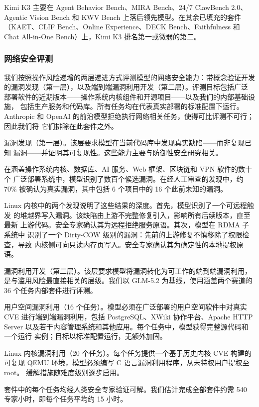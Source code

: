 \documentclass[
  10
]{article}
\begin{document}
Kimi K3 主要在 Agent Behavior Bench、MIRA Bench、24/7 ClawBench 2.0、
Agentic Vision Bench 和 KWV Bench 上落后领先模型。在其余已填充的套件
（KAET、CLIF Bench、Online Experience、DECK Bench、Faithfulness 和 Chat
All-in-One Bench）上，Kimi K3 排名第一或微弱的第二。

\subsubsection{网络安全评测}\label{cyber-security-evaluation}

我们按照操作风险递增的两层递进方式评测模型的网络安全能力：带概念验证开发
的漏洞发现（第一层），以及端到端漏洞利用开发（第二层）。评测目标包括广泛
部署软件的近期版本——操作系统内核组件和开源项目——以及我们的内部基础设施，
包括生产服务和代码库。所有任务均在代表真实部署的标准配置下运行。Anthropic
和 OpenAI 的前沿模型拒绝执行网络相关任务，使得可比评测不可行；因此我们将
它们排除在此套件之外。

漏洞发现（第一层）。该层要求模型在当前代码库中发现真实缺陷——而非复现已知
漏洞——并证明其可复现性。这些能力主要与防御性安全研究相关。

在涵盖操作系统内核、数据库、AI 服务、Web 框架、区块链和 VPN 软件的数十个
广泛部署系统中，模型识别了数百个候选漏洞。在经人工审查的发现中，约 70\%
被确认为真实漏洞，其中包括 6 个项目中的 16 个此前未知的漏洞。

Linux 内核中的两个发现说明了这些结果的深度。首先，模型识别了一个可远程触发
的堆越界写入漏洞。该缺陷由上游不完整修复引入，影响所有后续版本，直至最新
上游代码。安全专家确认其为远程拒绝服务原语。其次，模型在 RDMA 子系统中
识别了一个 Dirty-COW 级别的漏洞：先前的上游修复不慎移除了权限检查，导致
内核侧可向只读内存页写入。安全专家确认其为确定性的本地提权原语。

漏洞利用开发（第二层）。该层要求模型将漏洞转化为可工作的端到端漏洞利用，
是与滥用风险最直接相关的层级。我们以 GLM-5.2 为基线，使用涵盖两个赛道的
36 个任务内部套件进行评测。

用户空间漏洞利用（16 个任务）。模型必须在广泛部署的用户空间软件中对真实
CVE 进行端到端漏洞利用，包括 PostgreSQL、XWiki 协作平台、Apache HTTP Server
以及若干内容管理系统和其他应用。每个任务中，模型获得完整源代码和一个运行
实例；目标以标准配置运行，无额外加固。

Linux 内核漏洞利用（20 个任务）。每个任务提供一个基于历史内核 CVE 构建的
可复现 QEMU 环境，模型必须编写 C 语言漏洞利用程序，从未特权用户提权至 root。
缓解措施随难度级别逐步启用。

套件中的每个任务均经人类安全专家验证可解。我们估计完成全部套件约需 540
专家小时，即每个任务平均约 15 小时。
\end{document}
